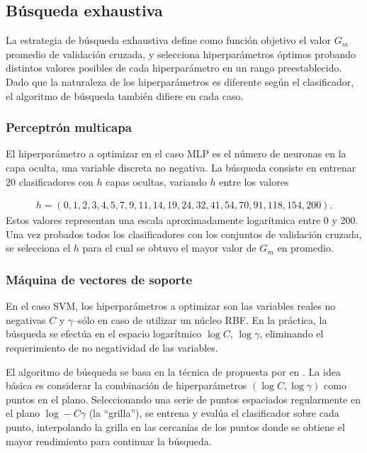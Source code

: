 
\subsection{Búsqueda exhaustiva}
La estrategia de búsqueda exhaustiva define como función objetivo el
valor $G_m$ promedio de validación cruzada, y selecciona
hiperparámetros óptimos probando distintos valores posibles de cada
hiperparámetro en un rango preestablecido.  Dado que la naturaleza de
los hiperparámetros es diferente según el clasificador, el algoritmo
de búsqueda también difiere en cada caso.

\subsubsection{Perceptrón multicapa}
El hiperparámetro a optimizar en el caso MLP es el número de neuronas
en la capa oculta, una variable discreta no negativa.  La búsqueda
consiste en entrenar 20 clasificadores con $h$ capas ocultas, variando
$h$ entre los valores

\begin{align}
  \label{mlp-hidden-tries}
  h=(0,1,2,3,4,5,7,9,11,14,19,24,32,41,54,70,91,118,154,200).
\end{align}
Estos valores representan una escala aproximadamente logarítmica entre
0 y 200. Una vez probados todos los clasificadores con los conjuntos
de validación cruzada, se selecciona el $h$ para el cual se obtuvo el
mayor valor de $G_m$ en promedio.

\subsubsection{Máquina de vectores de soporte}
En el caso SVM, los hiperparámetros a optimizar son las variables
reales no negativas $C$ y $\gamma$--sólo en caso de utilizar un núcleo
RBF. En la práctica, la búsqueda se efectúa en el espacio logarítmico
$\log{}C$, $\log\gamma$, eliminando el requerimiento de no negatividad
de las variables.

El algoritmo de búsqueda se basa en la técnica de  propuesta por \citeauthor{hsu} en \cite{hsu}.  La idea
básica es considerar la combinación de hiperparámetros $(\log
C,\log\gamma)$ como puntos en el plano.  Seleccionando una serie de
puntos espaciados regularmente en el plano $\log-C\gamma$ (la
``grilla''), se entrena y evalúa el clasificador sobre cada punto,
interpolando la grilla en las cercanías de los puntos donde se obtiene
el mayor rendimiento para continuar la búsqueda.

